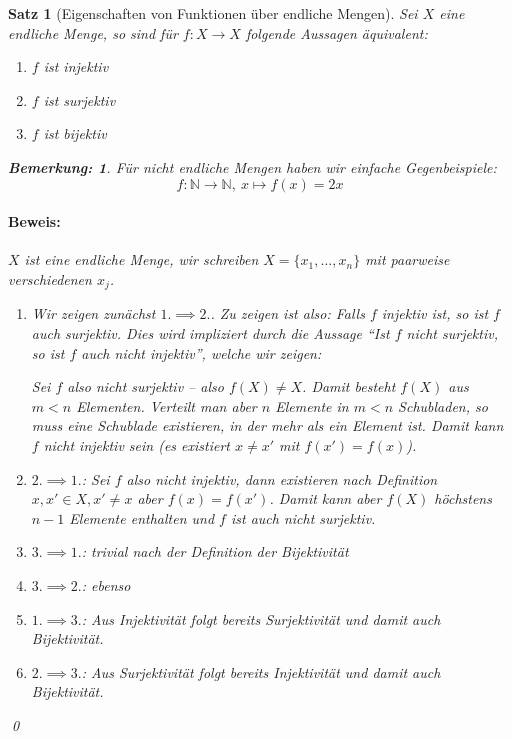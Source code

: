 \documentclass{report}
\newcommand{\N}{\mathbb{N}}
\theoremstyle{customrem}
\newtheorem*{bemerkung}{Bemerkung\textnormal:}
\theoremstyle{customdef}
\newtheorem{satz}[definition]{Satz}
\renewenvironment{proof}{\paragraph{Beweis: }}{\qed}
\theoremstyle{customenv}
\begin{document}
	\begin{satz}[Eigenschaften von Funktionen über endliche Mengen]
		Sei \(X\) eine endliche Menge, so sind für \(f : X \to X\) folgende Aussagen äquivalent:
		\begin{enumerate}
			\itemsep0cm
			\item \(f\) ist injektiv
			\item \(f\) ist surjektiv
			\item \(f\) ist bijektiv
		\end{enumerate}

		\begin{bemerkung}
			Für nicht endliche Mengen haben wir einfache Gegenbeispiele:
			\[f : \N \to \N,\ x \mapsto f(x) = 2x\]
		\end{bemerkung}

		\begin{proof}
			\(X\) ist eine endliche Menge, wir schreiben \(X = \{x_1, \dots, x_n\}\) mit paarweise verschiedenen \(x_j\).
			\begin{enumerate}
				\item[i)] Wir zeigen zunächst \(1. \implies 2.\). Zu zeigen ist also: Falls \(f\) injektiv ist, so ist \(f\) auch surjektiv. Dies wird impliziert durch die Aussage "`Ist \(f\) \textit{nicht} surjektiv, so ist \(f\) auch \textit{nicht} injektiv"', welche wir zeigen:

				Sei \(f\) also nicht surjektiv -- also \(f(X) \neq X\). Damit besteht \(f(X)\) aus \(m < n\) Elementen. Verteilt man aber \(n\) Elemente in \(m < n\) Schubladen, so muss eine Schublade existieren, in der mehr als ein Element ist. Damit kann \(f\) nicht injektiv sein (es existiert \(x \neq x'\) mit \(f(x') = f(x)\)).
				\item[ii)] \(2. \implies 1.\): Sei \(f\) also nicht injektiv, dann existieren nach Definition \(x, x' \in X, x' \neq x\) aber \(f(x) = f(x')\). Damit kann aber \(f(X)\) höchstens \(n-1\) Elemente enthalten und \(f\) ist auch nicht surjektiv.
				\item[iii)] \(3. \implies 1.\): trivial nach der Definition der Bijektivität
				\item[iv)] \(3. \implies 2.\): ebenso
				\item[v)] \(1. \implies 3.\): Aus Injektivität folgt bereits Surjektivität und damit auch Bijektivität.
				\item[vi)] \(2. \implies 3.\): Aus Surjektivität folgt bereits Injektivität und damit auch Bijektivität.
			\end{enumerate}
		\end{proof}
	\end{satz}
\end{document}
